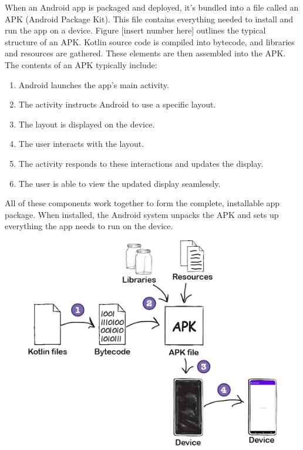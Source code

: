 When an Android app is packaged and deployed, it’s bundled into a file called an APK (Android Package Kit). This file contains everything needed to install and run the app on a device. Figure [insert number here] outlines the typical structure of an APK.
Kotlin source code is compiled into bytecode, and libraries and resources are gathered. These elements are then assembled into the APK. The contents of an APK typically include:
\begin{enumerate}
	\item Android launches the app’s main activity.
	\item The activity instructs Android to use a specific layout.
	\item The layout is displayed on the device.
	\item The user interacts with the layout.
	\item The activity responds to these interactions and updates the display.
	\item The user is able to view the updated display seamlessly.
\end{enumerate}

All of these components work together to form the complete, installable app package. When installed, the Android system unpacks the APK and sets up everything the app needs to run on the device.
\begin{figure}[H]
	\centering
	\includegraphics[width=0.7\linewidth]{apk_to_app.png}
	\caption{}
	\label{fig:apktoapp}
\end{figure}


